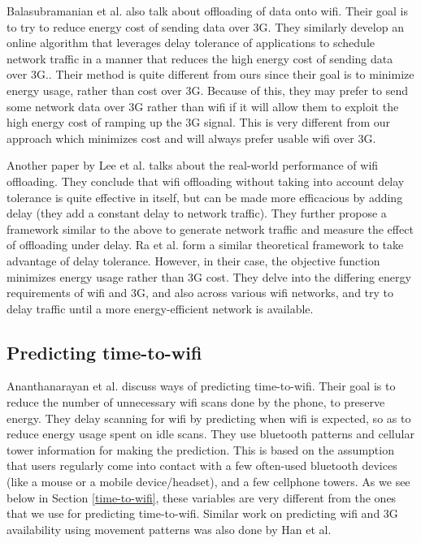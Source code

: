 \documentclass[12pt, fleqn]{article}
\begin{document}
Balasubramanian et al. also talk about offloading of data onto wifi. Their goal 
is to try to reduce energy cost of sending data over 3G. They similarly develop
an online algorithm that leverages delay tolerance of applications to schedule 
network traffic in a manner that reduces the high energy cost of 
sending data over 3G.\cite{balasubramanian-2009}. Their method is quite 
different from ours since their goal is to minimize energy usage, rather than 
cost over 3G. Because of this, they may prefer to send some network data over 3G 
rather than wifi if it will allow them to exploit the high energy cost of 
ramping up the 3G signal. This is very different from our approach which 
minimizes cost and will always prefer usable wifi over 3G. 

Another paper by Lee et al. talks about the real-world performance of wifi 
offloading. They conclude that wifi offloading without taking into account delay 
tolerance is quite effective in itself, but can be made more efficacious by 
adding delay (they add a constant delay to network traffic). They further 
propose a framework similar to the above to generate network traffic and measure 
the effect of offloading under delay.\cite{lee-2012}  
Ra et al. form a similar theoretical framework to take advantage of delay 
tolerance. However, in their case, the objective function minimizes energy usage 
rather than 3G cost. They delve into the differing energy requirements of wifi 
and 3G, and also across various wifi networks, and try to delay traffic until a 
more energy-efficient network is available.\cite{ra-2010}

\subsection{Predicting time-to-wifi}
\label{related-work-wifi}

Ananthanarayan et al. discuss ways of predicting time-to-wifi. Their goal is to 
reduce the number of unnecessary wifi scans done by the phone, to preserve energy. They delay scanning  
for wifi by predicting when wifi is expected, so as to reduce energy usage spent on idle scans.
They use bluetooth patterns and cellular tower information for making the prediction. 
This is based on the assumption that
users regularly come into contact with a few often-used bluetooth devices (like a mouse or a mobile
device/headset), and a few cellphone towers.\cite{ananthanarayanan-2009} As we see below 
in Section \ref{time-to-wifi}, these variables are very different from the ones that we use for 
predicting time-to-wifi. Similar work on predicting wifi and 3G availability using movement
patterns was also done by Han et al.\cite{han-2008} 
\end{document}
